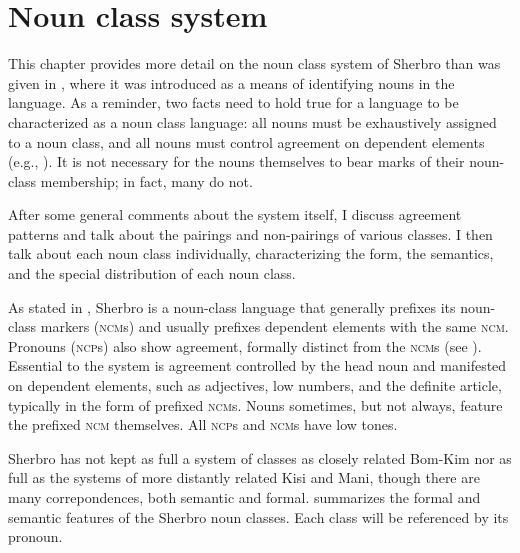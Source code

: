 \chapter{Noun class system}
\label{ch:5}\hypertarget{Toc115517787}{}
This chapter provides more detail on the noun class system of Sherbro than was given in , where it was introduced as a means of identifying nouns in the language. As a reminder, two facts need to hold true for a language to be characterized as a noun class language: all nouns must be exhaustively assigned to a noun class, and all nouns must control agreement on dependent elements (e.g., \citealt{Greenberg1977}). It is not necessary for the nouns themselves to bear marks of their noun-class membership; in fact, many do not.

After some general comments about the system itself, I discuss agreement patterns and talk about the pairings and non-pairings of various classes. I then talk about each noun class individually, characterizing the form, the semantics, and the special distribution of each noun class.

As stated in , Sherbro is a noun-class language that generally prefixes its noun-class markers (\textsc{ncm}s) and usually prefixes dependent elements with the same \textsc{ncm}. Pronouns (\textsc{ncp}s) also show agreement, formally distinct from the \textsc{ncm}s (see ). Essential to the system is agreement controlled by the head noun and manifested on dependent elements, such as adjectives, low numbers, and the definite article, typically in the form of prefixed \textsc{ncm}s. Nouns sometimes, but not always, feature the prefixed \textsc{ncm} themselves. All \textsc{ncp}s and \textsc{ncm}s have low tones.

Sherbro has not kept as full a system of classes as closely related Bom-Kim nor as full as the systems of more distantly related Kisi and Mani, though there are many correpondences, both semantic and formal.  summarizes the formal and semantic features of the Sherbro noun classes. Each class will be referenced by its pronoun.


